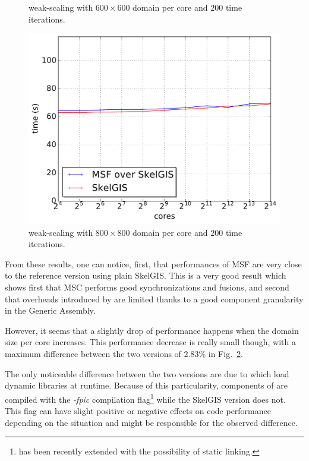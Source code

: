 \begin{figure}[t]
\begin{minipage}{.475\textwidth}
  \caption{weak-scaling with $600 \times 600$ domain per core and $200$ time iterations.}
  \label{fig:weak2}
\end{minipage}\end{figure}

\begin{figure}[t]
\begin{center}
  \includegraphics[width=.6\textwidth]{../results/weak_scaling/800_200/median_weak.pdf}
  \caption{weak-scaling with $800 \times 800$ domain per core and $200$ time iterations.}
  \label{fig:weak3}
 \end{center}
\end{figure}

From these results, one can notice, first, that performances of MSF are very close to the reference version using plain SkelGIS. This is a very good result which shows first that MSC performs good synchronizations and fusions, and second that overheads introduced by \llc are limited thanks to a good component granularity in the Generic Assembly.

However, it seems that a slightly drop of performance happens when the domain size per core increases. This performance decrease is really small though, with a maximum difference between the two versions of 2.83\% in Fig.~\ref{fig:weak3}.

The only noticeable difference between the two versions are due to \llc which load dynamic libraries at runtime. Because of this particularity, components of \llc are compiled with the \emph{-fpic} compilation flag\footnote{\llc has been recently extended with the possibility of static linking.} while the SkelGIS version does not. This flag can have slight positive or negative effects on code performance depending on the situation and might be responsible for the observed difference.

